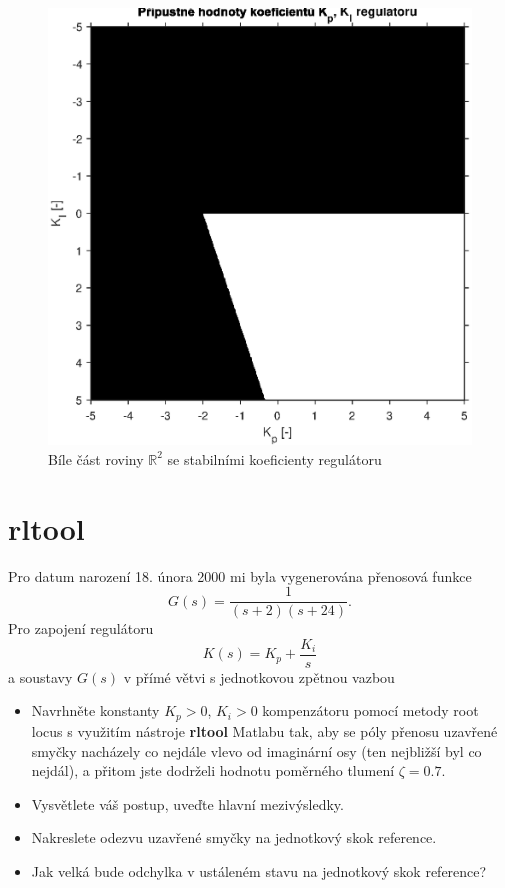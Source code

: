 \documentclass[twoside]{article}
\begin{document}
\begin{figure}
	\centering
	\includegraphics[width=0.8\linewidth]{stabilni_koeficienty.eps}
	\caption{Bíle část roviny $\mathbb{R}^2$ se stabilními koeficienty regulátoru}
	\label{fig:mozne_hodnoty}
\end{figure}

\section{rltool}

Pro datum narození 18. února 2000 mi byla vygenerována přenosová funkce
\begin{equation}
	G(s) = \frac{1}{(s+2)(s+24)}.
\end{equation}
Pro zapojení regulátoru 
\begin{equation}
	K(s) = K_p + \frac{K_i}{s}
\end{equation}
a soustavy $G(s)$ v přímé větvi s jednotkovou zpětnou vazbou
\begin{itemize}
	\item Navrhněte konstanty $K_p > 0$, $K_i > 0$ kompenzátoru pomocí metody root locus s využitím nástroje
	\textbf{rltool} Matlabu tak, aby se póly přenosu uzavřené smyčky nacházely co nejdále vlevo od
	imaginární osy (ten nejbližší byl co nejdál), a přitom jste dodrželi hodnotu poměrného tlumení
	$\zeta = 0.7$.
	\item Vysvětlete váš postup, uveďte hlavní mezivýsledky.
	\item Nakreslete odezvu uzavřené smyčky na jednotkový skok reference.
	\item Jak velká bude odchylka v ustáleném stavu na jednotkový skok reference? 
\end{itemize}
\end{document}
